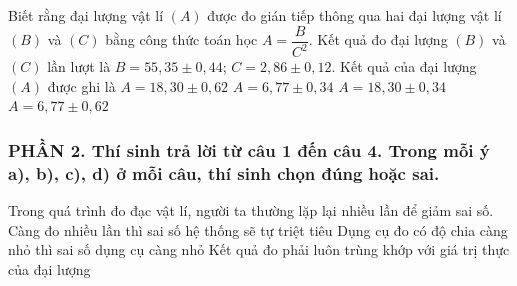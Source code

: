 \begin{ex}%
Biết rằng đại lượng vật lí $(A)$ được đo gián tiếp thông qua hai đại lượng vật lí $(B)$ và $(C)$ bằng công thức toán học $A=\dfrac{B}{C^2}$. Kết quả đo đại lượng $(B)$ và $(C)$ lần lượt là $B=55,35 \pm 0,44$; $C=2,86 \pm 0,12$. Kết quả của đại lượng $(A)$ được ghi là
\choice
{$A=18,30 \pm 0,62$}
{$A=6,77 \pm 0,34$}
{$A=18,30 \pm 0,34$}
{\True $A=6,77 \pm 0,62$}
\end{ex}










\subsubsection*{PHẦN 2. Thí sinh trả lời từ câu 1 đến câu 4. Trong mỗi ý a), b), c), d) ở mỗi câu, thí sinh chọn đúng hoặc sai.}
\setcounter{ex}{0}
\begin{ex}%
Trong quá trình đo đạc vật lí, người ta thường lặp lại nhiều lần để giảm sai số.
{Càng đo nhiều lần thì sai số hệ thống sẽ tự triệt tiêu}
{\True Dụng cụ đo có độ chia càng nhỏ thì sai số dụng cụ càng nhỏ}
{Kết quả đo phải luôn trùng khớp với giá trị thực của đại lượng}
\end{ex}

